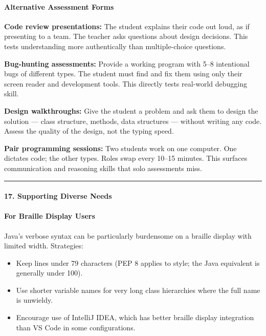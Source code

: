 \documentclass[
  justified,
  openright,
]{tufte-book}
\let\subsection\paragraph
\let\paragraph\paragraph
\let\subsection\paragraph
\let\paragraph\paragraph
\providecommand{\tightlist}{%
  \setlength{\itemsep}{0pt}\setlength{\parskip}{0pt}}
\begin{document}
\subsection{Alternative Assessment
Forms}\label{alternative-assessment-forms}

\textbf{Code review presentations:} The student explains their code out
loud, as if presenting to a team. The teacher asks questions about
design decisions. This tests understanding more authentically than
multiple-choice questions.

\textbf{Bug-hunting assessments:} Provide a working program with 5--8
intentional bugs of different types. The student must find and fix them
using only their screen reader and development tools. This directly
tests real-world debugging skill.

\textbf{Design walkthroughs:} Give the student a problem and ask them to
design the solution --- class structure, methods, data structures ---
without writing any code. Assess the quality of the design, not the
typing speed.

\textbf{Pair programming sessions:} Two students work on one computer.
One dictates code; the other types. Roles swap every 10--15 minutes.
This surfaces communication and reasoning skills that solo assessments
miss.

\begin{center}\rule{0.5\linewidth}{0.5pt}\end{center}

\subsection{17. Supporting Diverse
Needs}\label{supporting-diverse-needs-1}

\subsection{For Braille Display
Users}\label{for-braille-display-users}

Java's verbose syntax can be particularly burdensome on a braille
display with limited width. Strategies:

\begin{itemize}
\tightlist
\item
  Keep lines under 79 characters (PEP 8 applies to style; the Java
  equivalent is generally under 100).
\item
  Use shorter variable names for very long class hierarchies where the
  full name is unwieldy.
\item
  Encourage use of IntelliJ IDEA, which has better braille display
  integration than VS Code in some configurations.
\end{itemize}
\end{document}
